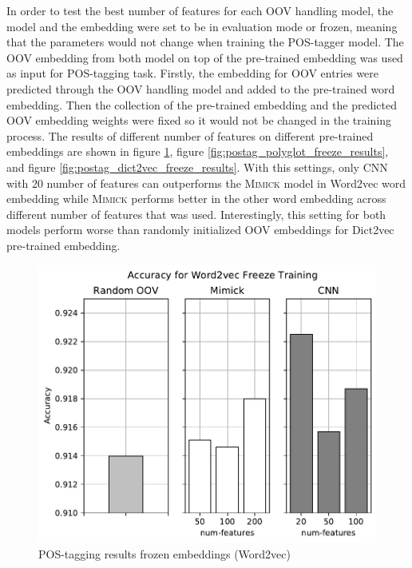       In order to test the best number of features for each
      OOV handling model, the model and the embedding were set to be
      in evaluation mode or frozen, meaning that the parameters would
      not change when training the POS-tagger model. The OOV embedding
      from both model on top of the pre-trained embedding was used as
      input for POS-tagging task. Firstly, the embedding for OOV
      entries were predicted through the OOV handling model and added
      to the pre-trained word embedding. Then the collection of the
      pre-trained embedding and the predicted OOV embedding weights
      were fixed so it would not be changed in the training process.
      The results of different number of features on different
      pre-trained embeddings are shown in figure
      \ref{fig:postag_word2vec_freeze_results}, figure
      \ref{fig:postag_polyglot_freeze_results}, and figure
      \ref{fig:postag_dict2vec_freeze_results}. With this settings,
      only CNN with 20 number of features can outperforms the
      \textsc{Mimick} model in Word2vec word embedding while
      \textsc{Mimick} performs better in the other word embedding
      across different number of features that was used. Interestingly, this
      setting for both models perform worse than randomly initialized
      OOV embeddings for Dict2vec pre-trained embedding.
      \begin{figure}[H]
        \centering
        \includegraphics[width=0.8\linewidth]{images/freeze_word2vec.pdf}
        \caption{POS-tagging results frozen embeddings (Word2vec)}
        \label{fig:postag_word2vec_freeze_results}
      \end{figure}
